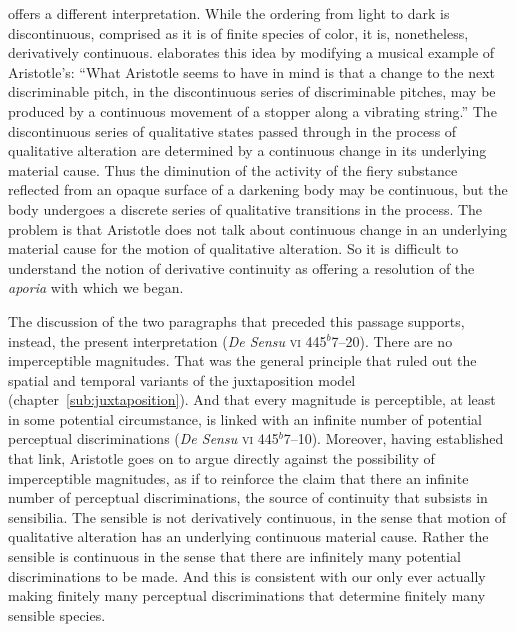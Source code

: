 \citet[]{Sorabji:1976fk} offers a different interpretation. While the ordering from light to dark is discontinuous, comprised as it is of finite species of color, it is, nonetheless, derivatively continuous. \citet[80]{Sorabji:1976fk} elaborates this idea by modifying a musical example of Aristotle's: ``What Aristotle seems to have in mind is that a change to the next discriminable pitch, in the discontinuous series of discriminable pitches, may be produced by a continuous movement of a stopper along a vibrating string.'' The discontinuous series of qualitative states passed through in the process of qualitative alteration are determined by a continuous change in its underlying material cause. Thus the diminution of the activity of the fiery substance reflected from an opaque surface of a darkening body may be continuous, but the body undergoes a discrete series of qualitative transitions in the process. The problem is that Aristotle does not talk about continuous change in an underlying material cause for the motion of qualitative alteration. So it is difficult to understand the notion of derivative continuity as offering a resolution of the \emph{aporia} with which we began.

The discussion of the two paragraphs that preceded this passage supports, instead, the present interpretation (\emph{De Sensu} \textsc{vi} 445\( ^{b} \)7--20). There are no imperceptible magnitudes. That was the general principle that ruled out the spatial and temporal variants of the juxtaposition model (chapter~\ref{sub:juxtaposition}). And that every magnitude is perceptible, at least in some potential circumstance, is linked with an infinite number of potential perceptual discriminations (\emph{De Sensu} \textsc{vi} 445\( ^{b} \)7--10). Moreover, having established that link, Aristotle goes on to argue directly against the possibility of imperceptible magnitudes, as if to reinforce the claim that there an infinite number of perceptual discriminations, the source of continuity that subsists in sensibilia. The sensible is not derivatively continuous, in the sense that motion of qualitative alteration has an underlying continuous material cause. Rather the sensible is continuous in the sense that there are infinitely many potential discriminations to be made. And this is consistent with our only ever actually making finitely many perceptual discriminations that determine finitely many sensible species.

